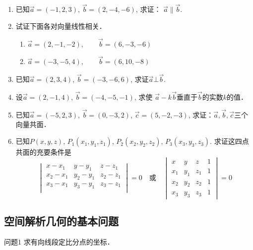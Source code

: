 \begin{ex}
\begin{enumerate}
    \item 已知$\vec{a}=(-1,2,3)$, $\vec{b}=(2,-4,-6)$, 求证：
$\vec{a}\parallel \vec{b}$.
\item 试证下面各对向量线性相关．
\begin{enumerate}
    \item $\vec{a}=(2,-1,-2),\qquad \vec{b}=(6,-3,-6)$
    \item $\vec{a}=(-3,-5,4),\qquad   \vec{b}=(6,10,-8)$
\end{enumerate}

 \item 已知$\vec{a}=(2,3,4)$, $\vec{b}=(-3,-6,6)$, 求证$\vec{a}\bot \vec{b}$.

 \item 设$\vec{a}=(2,-1,4)$, $\vec{b}=(-4,-5,-1)$, 求使
 $\vec{a}-k\vec{b}$垂直于$\vec{b}$的实数$k$的值．

 \item 已知$\vec{a}=(-5,2,3)$, $\vec{b}=(0,-3,2)$, $\vec{c}=(5,
 -2,-3)$, 求证：$\vec{a},\vec{b},\vec{c}$三个向量共面．
\item 已知$P(x,y,z)$, $P_1(x_1,y_1,z_1)$, $P_2(x_2,y_2,
z_2)$, $P_3(x_3,y_3,z_3)$. 求证这四点共面的充要条件是
\[\begin{vmatrix}
    x-x_1 &y-y_1&z-z_1\\
    x_2-x_1 &y_2-y_1&z_2-z_1\\
    x_3-x_1 &y_3-y_1&z_3-z_1\\
\end{vmatrix}=0\quad \text{或}\quad \begin{vmatrix}
    x&y&z&1\\x_1 & y_1&z_1& 1\\
    x_2 & y_2&z_2& 1\\x_3 & y_3&z_3& 1
\end{vmatrix}=0\]
\end{enumerate}   
\end{ex}

\subsection{空间解析几何的基本问题}
\begin{blk}{问题1}
    求有向线段定比分点的坐标．
\end{blk}
 
